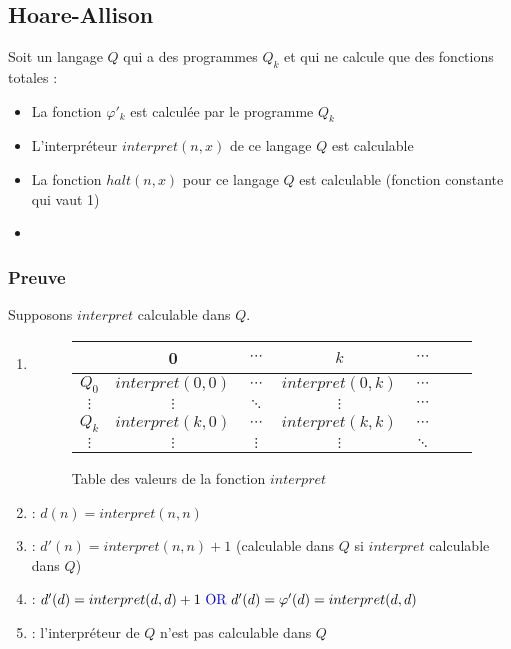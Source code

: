 \newpage
\subsection{Hoare-Allison}

Soit un langage $Q$ qui a des programmes $Q_k$ et qui ne calcule que des fonctions totales :
\begin{itemize}
\item La fonction $\varphi'_k$ est calculée par le programme $Q_k$
\item L'interpréteur $interpret(n,x)$ de ce langage $Q$ est calculable
\item La fonction $halt(n,x)$ pour ce langage $Q$ est calculable (fonction constante qui vaut 1)
\item {}
\end{itemize}

\subsubsection{Preuve}

Supposons $interpret$ calculable dans $Q$.

\begin{enumerate}
\item {}
	\begin{figure}[H]
    		\centering
    		\begin{tabular}{c|cccccc}
		 & 0 & $\cdots$ & $k$ & $\cdots$ \\ 
		\hline 
		$Q_0$ & $interpret(0,0)$ & $\cdots$ & $interpret(0,k)$ & $\cdots$ \\
		$\vdots$ & $\vdots$ & $\ddots$ & $\vdots$ & $\cdots$ \\ 
		$Q_k$ & $interpret(k,0)$ & $\cdots$ & $interpret(k,k)$ & $\cdots$ \\ 
		$\vdots$ & $\vdots$ & $\vdots$ & $\vdots$ & $\ddots$ \\ 
		\end{tabular}
		\caption{Table des valeurs de la fonction $interpret$}
	\end{figure}
\item {} : $d(n) = interpret(n,n)$
\item {} : $d'(n)= interpret(n,n) + 1$ (calculable dans $Q$ si $interpret$ calculable dans $Q$)
\item {} : $d'(d)= interpret(d,d) + 1 \text{ \textblue{OR} } d'(d) = \varphi'(d) = interpret(d,d)$
\item {} : l’interpréteur de $Q$ n'est pas calculable dans $Q$
\end{enumerate}


